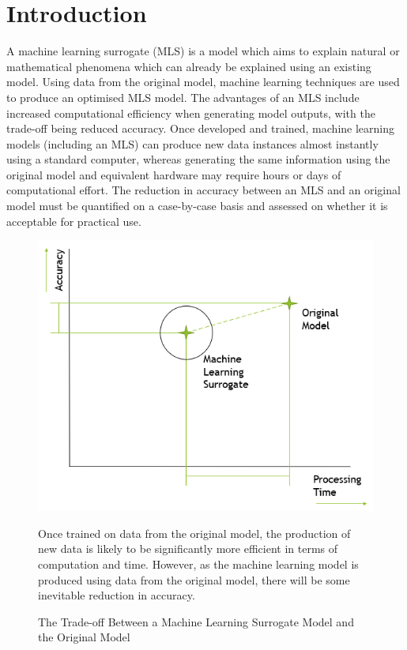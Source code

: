 \section{Introduction}

A machine learning surrogate (MLS) is a model which aims to explain natural or mathematical phenomena which can already be explained using an existing model. Using data from the original model, machine learning techniques are used to produce an optimised MLS model. The advantages of an MLS include increased computational efficiency when generating model outputs, with the trade-off being reduced accuracy. Once developed and trained, machine learning models (including an MLS) can produce new data instances almost instantly using a standard computer, whereas generating the same information using the original model and equivalent hardware may require hours or days of computational effort. The reduction in accuracy between an MLS and an original model must be quantified on a case-by-case basis and assessed on whether it is acceptable for practical use.
\\

\begin{figure}[h]
	\centering
	\includegraphics[scale=0.65]{Figures/MLS_vs_OM.png}
	\caption{The Trade-off Between a Machine Learning Surrogate Model and the Original Model} {Once trained on data from the original model, the production of new data is likely to be significantly more efficient in terms of computation and time. However, as the machine learning model is produced using data from the original model, there will be some inevitable reduction in accuracy.}
	\label{fig:surrogate_vs_model}
\end{figure}

